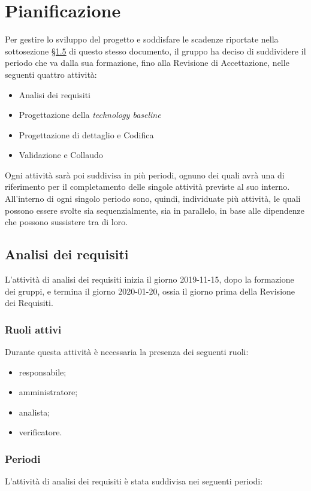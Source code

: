 \section{Pianificazione}
	Per gestire lo sviluppo del progetto e soddisfare le scadenze riportate nella sottosezione \hyperref[riferimento_scadenze]{\S1.5} di questo stesso documento, il gruppo ha deciso di suddividere il periodo che va dalla sua formazione, fino alla Revisione di Accettazione, nelle seguenti quattro attività:
	\begin{itemize}
		\item Analisi dei requisiti
		\item Progettazione della \textit{technology baseline}
		\item Progettazione di dettaglio e Codifica
		\item Validazione e Collaudo
	\end{itemize}
	Ogni attività sarà poi suddivisa in più periodi, ognuno dei quali avrà una  di riferimento per il completamento delle singole attività previste al suo interno. All'interno di ogni singolo periodo sono, quindi, individuate più attività, le quali possono essere svolte sia sequenzialmente, sia in parallelo, in base alle dipendenze che possono sussistere tra di loro.
	
	\subsection{Analisi dei requisiti}
		L'attività di analisi dei requisiti inizia il giorno 2019-11-15, dopo la formazione dei gruppi, e termina il giorno 2020-01-20, ossia il giorno prima della Revisione dei Requisiti.
		\subsubsection{Ruoli attivi}
			Durante questa attività è necessaria la presenza dei seguenti ruoli:
			\begin{itemize}
				\item responsabile;
				\item amministratore;
				\item analista;
				\item verificatore.
			\end{itemize}
		\subsubsection{Periodi}
			L'attività di analisi dei requisiti è stata suddivisa nei seguenti periodi:
